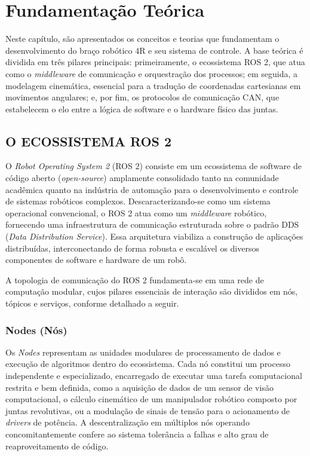 \chapter{Fundamentação Teórica}\label{cap:Fundamentação teórica}
Neste capítulo, são apresentados os conceitos e teorias que fundamentam o desenvolvimento do braço robótico 4R e seu sistema de controle. A base teórica é dividida em três pilares principais: primeiramente, o ecossistema ROS 2, que atua como o \textit{middleware} de comunicação e orquestração dos processos; em seguida, a modelagem cinemática, essencial para a tradução de coordenadas cartesianas em movimentos angulares; e, por fim, os protocolos de comunicação CAN, que estabelecem o elo entre a lógica de software e o hardware físico das juntas.

\section{O ECOSSISTEMA ROS 2}
O \textit{Robot Operating System 2} (ROS 2) consiste em um ecossistema de software de código aberto (\textit{open-source}) amplamente consolidado tanto na comunidade acadêmica quanto na indústria de automação para o desenvolvimento e controle de sistemas robóticos complexos. Descaracterizando-se como um sistema operacional convencional, o ROS 2 atua como um \textit{middleware} robótico, fornecendo uma infraestrutura de comunicação estruturada sobre o padrão DDS (\textit{Data Distribution Service}). Essa arquitetura viabiliza a construção de aplicações distribuídas, interconectando de forma robusta e escalável os diversos componentes de software e hardware de um robô.

A topologia de comunicação do ROS 2 fundamenta-se em uma rede de computação modular, cujos pilares essenciais de interação são divididos em nós, tópicos e serviços, conforme detalhado a seguir.

\subsection{Nodes (Nós)}
Os \textit{Nodes} representam as unidades modulares de processamento de dados e execução de algoritmos dentro do ecossistema. Cada nó constitui um processo independente e especializado, encarregado de executar uma tarefa computacional restrita e bem definida, como a aquisição de dados de um sensor de visão computacional, o cálculo cinemático de um manipulador robótico composto por juntas revolutivas, ou a modulação de sinais de tensão para o acionamento de \textit{drivers} de potência. A descentralização em múltiplos nós operando concomitantemente confere ao sistema tolerância a falhas e alto grau de reaproveitamento de código.


